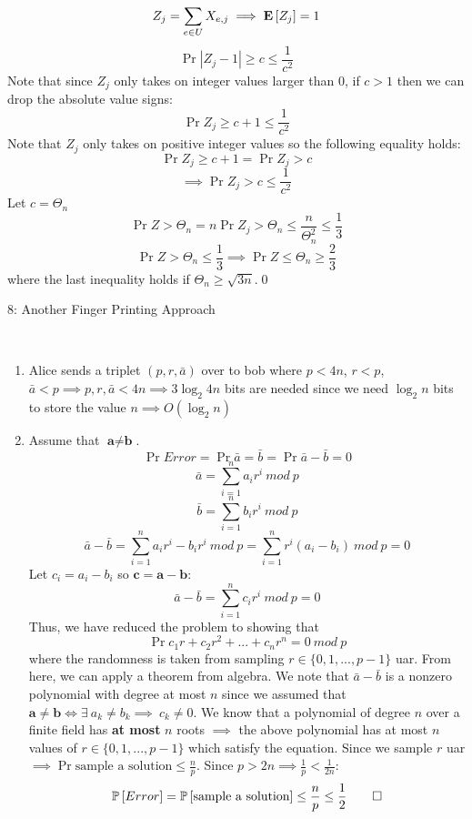 \documentclass[12pt]{article}
\begin{document}
\begin{solution}
\begin{enumerate}[label=(\alph*)]
\[
Z_j = \sum_{e\in U}{X_{e,j}} \implies \Exp{Z_j} = 1
\]
\[
\Pr{|Z_j -1| \geq c} \leq \frac{1}{c^2}
\]
Note that since $Z_j$ only takes on integer values larger than $0$, if $c >1$ then we can drop the absolute value signs:
\[
\Pr{Z_j \geq c + 1} \leq \frac{1}{c^2}
\]
Note that $Z_j$ only takes on positive integer values so the following equality holds: 
\[
\Pr{Z_j \geq c + 1} = \Pr{Z_j > c}
\]
\[
\implies \Pr{Z_j > c} \leq \frac{1}{c^2}
\]
Let $c = \Theta_n$
\[
\Pr{Z > \Theta_n} = n\Pr{Z_j > \Theta_n} \leq \frac{n}{\Theta^2_n} \leq \frac{1}{3}
\]
\[
\Pr{Z > \Theta_n} \leq \frac{1}{3} \implies \Pr{Z \leq \Theta_n} \geq \frac{2}{3}
\]
where the last inequality holds if $\Theta_n \geq \sqrt{3n}$.\qed

\end{enumerate}
\end{solution}


\begin{problem}{8: Another Finger Printing Approach}
\end{problem}
\begin{solution} \ \\

\begin{enumerate}[label=(\alph*)]
\item Alice sends a triplet $(p, r,\bar{a})$ over to bob where $p < 4n$, $r < p$, $\bar{a} < p \implies p,r,\bar{a} < 4n \implies 3\log_{2}{4n}$ bits are needed since we need $\log_{2}{n}$ bits to store the value $n \implies O(\log_{2}{n})$ 
\item Assume that $\textbf{a}\neq \textbf{b}$. 
\[
\Pr{Error} = \Pr{\bar{a} = \bar{b}} = \Pr{\bar{a}-\bar{b} = 0}
\]
\[
\bar{a} = \sum_{i=1}^{n}{a_{i}r^i}~ mod~p
\]
\[
\bar{b} = \sum_{i=1}^{n}{b_{i}r^i}~ mod~p
\]
\[
\bar{a} - \bar{b} = \sum_{i=1}^{n}{a_{i}r^i - b_{i}r^i}~ mod~p
 = \sum_{i=1}^{n}{r^i(a_{i} - b_{i})}~ mod~p = 0
\]
Let $c_i = a_i - b_i$ so $\textbf{c}  = \textbf{a} - \textbf{b}$:
\[
\bar{a} - \bar{b} = \sum_{i=1}^{n}{c_{i}r^i}~ mod~p = 0
\]
Thus, we have reduced the problem to showing that
\[
\Pr{c_1r + c_2r^2 + ... + c_nr^n = 0 ~ mod~p}
\]
where the randomness is taken from sampling $r\in \{0,1,...,p-1\}$ uar.
From here, we can apply a theorem from algebra. We note that $\bar{a} - \bar{b}$ is a nonzero polynomial with degree at most $n$ since we assumed that $\textbf{a}\neq \textbf{b} \iff \exists~a_k\neq b_k \implies ~c_k\neq0$. We know that a polynomial of degree $n$ over a finite field has \textbf{at most} $n$ roots $\implies$ the above polynomial has at most $n$ values of $r \in \{0,1,...,p-1\}$ which satisfy the equation. Since we sample $r$ uar $\implies \Pr{\text{sample a solution}} \leq \frac{n}{p}$. Since $p > 2n \implies \frac{1}{p} < \frac{1}{2n}$:
\[
\Pr{Error} =  \Pr{\text{sample a solution}} \leq \frac{n}{p} \leq \frac{1}{2} \qed
\]
\end{enumerate}



\end{solution}
\end{document}
